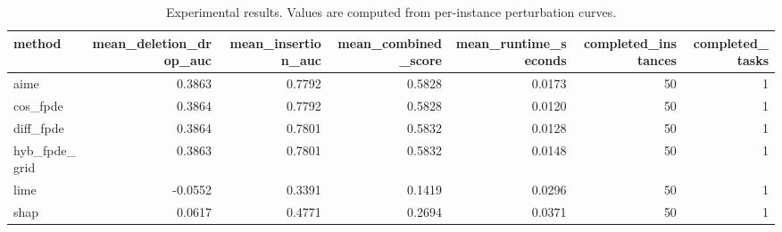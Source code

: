 \begin{table}[t]
\caption{Experimental results. Values are computed from per-instance perturbation curves.}
\label{tab:main_results_computed}
\centering
\begin{tabular}{lrrrrrr}
\toprule
method & mean\_deletion\_drop\_auc & mean\_insertion\_auc & mean\_combined\_score & mean\_runtime\_seconds & completed\_instances & completed\_tasks \\
\midrule
aime & 0.3863 & 0.7792 & 0.5828 & 0.0173 & 50 & 1 \\
cos\_fpde & 0.3864 & 0.7792 & 0.5828 & 0.0120 & 50 & 1 \\
diff\_fpde & 0.3864 & 0.7801 & 0.5832 & 0.0128 & 50 & 1 \\
hyb\_fpde\_grid & 0.3863 & 0.7801 & 0.5832 & 0.0148 & 50 & 1 \\
lime & -0.0552 & 0.3391 & 0.1419 & 0.0296 & 50 & 1 \\
shap & 0.0617 & 0.4771 & 0.2694 & 0.0371 & 50 & 1 \\
\bottomrule
\end{tabular}

\end{table}
